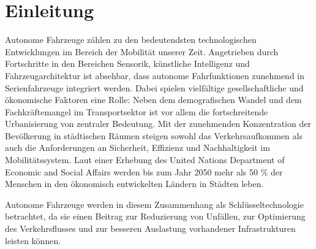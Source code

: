 \chapter{Einleitung}

Autonome Fahrzeuge zählen zu den bedeutendsten technologischen Entwicklungen im Bereich der Mobilität unserer Zeit. Angetrieben durch Fortschritte in den Bereichen Sensorik, künstliche Intelligenz und Fahrzeugarchitektur ist absehbar, dass autonome Fahrfunktionen zunehmend in Serienfahrzeuge integriert werden. Dabei spielen vielfältige gesellschaftliche und ökonomische Faktoren eine Rolle: Neben dem demografischen Wandel und dem Fachkräftemangel im Transportsektor ist vor allem die fortschreitende Urbanisierung von zentraler Bedeutung. Mit der zunehmenden Konzentration der Bevölkerung in städtischen Räumen steigen sowohl das Verkehrsaufkommen als auch die Anforderungen an Sicherheit, Effizienz und Nachhaltigkeit im Mobilitätssystem. Laut einer Erhebung des United Nations Department of Economic and Social Affairs \cite{bpb2017} werden bis zum Jahr 2050 mehr als 50 \% der Menschen in den ökonomisch entwickelten Ländern in Städten leben.

Autonome Fahrzeuge werden in diesem Zusammenhang als Schlüsseltechnologie betrachtet, da sie einen Beitrag zur Reduzierung von Unfällen, zur Optimierung des Verkehrsflusses und zur besseren Auslastung vorhandener Infrastrukturen leisten können.
